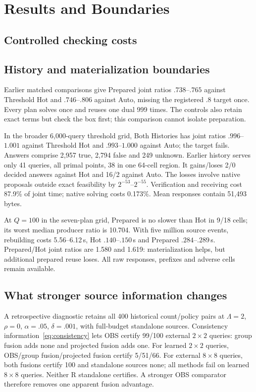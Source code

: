 \documentclass[conference]{IEEEtran}
\begin{document}
\section{Results and Boundaries}\label{sec:results}
\subsection{Controlled checking costs}


\subsection{History and materialization boundaries}
Earlier matched comparisons give Prepared joint ratios $.738$--$.765$ against Threshold Hot and $.746$--$.806$ against Auto, missing the registered $.8$ target once. Every plan solves once and reuses one dual 999 times. The controls also retain exact terms but check the box first; this comparison cannot isolate preparation.

In the broader 6,000-query threshold grid, Both Histories has joint ratios $.996$--$1.001$ against Threshold Hot and $.993$--$1.000$ against Auto; the target fails. Answers comprise 2,957 true, 2,794 false and 249 unknown. Earlier history serves only 41 queries, all primal points, 38 in one 64-cell region. It gains/loses 2/0 decided answers against Hot and 16/2 against Auto. The losses involve native proposals outside exact feasibility by $2^{-53}$--$2^{-55}$. Verification and receiving cost 87.9\% of joint time; native solving costs 0.173\%. Mean responses contain 51,493 bytes.

At $Q=100$ in the seven-plan grid, Prepared is no slower than Hot in 9/18 cells; its worst median producer ratio is 10.704. With five million source events, rebuilding costs 5.56--6.12\,s, Hot $.140$--$.150$\,s and Prepared $.284$--$.289$\,s. Prepared/Hot joint ratios are 1.580 and 1.619: materialization helps, but additional prepared reuse loses. All raw responses, prefixes and adverse cells remain available.

\subsection{What stronger source information changes}\label{sec:historical}
A retrospective diagnostic retains all 400 historical count/policy pairs at $\Lambda=2$, $\rho=0$, $\alpha=.05$, $\delta=.001$, with full-budget standalone sources. Consistency information~\eqref{eq:consistency} lets OBS certify 99/100 external $2\times2$ queries: group fusion adds none and projected fusion adds one. For learned $2\times2$ queries, OBS/group fusion/projected fusion certify 5/51/66. For external $8\times8$ queries, both fusions certify 100 and standalone sources none; all methods fail on learned $8\times8$ queries. Neither R standalone certifies. A stronger OBS comparator therefore removes one apparent fusion advantage.
\end{document}
